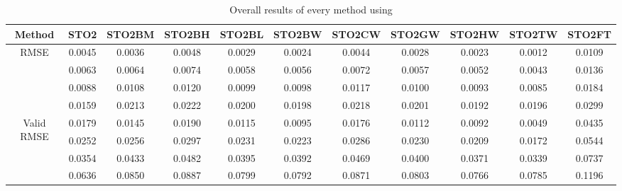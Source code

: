 \begin{table}[ht!]
\centering
\begin{tabular}{c|c|c|c|c|c|c|c|c|c|c}
Method & \scriptsize{STO2} & \scriptsize{STO2BM} & \scriptsize{STO2BH} & \scriptsize{STO2BL} & \scriptsize{STO2BW} & \scriptsize{STO2CW} & \scriptsize{STO2GW} & \scriptsize{STO2HW} & \scriptsize{STO2TW} & \scriptsize{STO2FT}\\ \hline 
\multirow{4}{*}{RMSE} & 0.0045 & 0.0036 & 0.0048 & 0.0029 & 0.0024 & 0.0044 & 0.0028 & 0.0023 & 0.0012 & 0.0109 \\ 
 & 0.0063 & 0.0064 & 0.0074 & 0.0058 & 0.0056 & 0.0072 & 0.0057 & 0.0052 & 0.0043 & 0.0136 \\ 
 & 0.0088 & 0.0108 & 0.0120 & 0.0099 & 0.0098 & 0.0117 & 0.0100 & 0.0093 & 0.0085 & 0.0184 \\ 
 & 0.0159 & 0.0213 & 0.0222 & 0.0200 & 0.0198 & 0.0218 & 0.0201 & 0.0192 & 0.0196 & 0.0299 \\ 
 \hline
\multirow{4}{*}{Valid RMSE} & 0.0179 & 0.0145 & 0.0190 & 0.0115 & 0.0095 & 0.0176 & 0.0112 & 0.0092 & 0.0049 & 0.0435 \\ 
 & 0.0252 & 0.0256 & 0.0297 & 0.0231 & 0.0223 & 0.0286 & 0.0230 & 0.0209 & 0.0172 & 0.0544 \\ 
 & 0.0354 & 0.0433 & 0.0482 & 0.0395 & 0.0392 & 0.0469 & 0.0400 & 0.0371 & 0.0339 & 0.0737 \\ 
 & 0.0636 & 0.0850 & 0.0887 & 0.0799 & 0.0792 & 0.0871 & 0.0803 & 0.0766 & 0.0785 & 0.1196 \\ 
 \hline 
\end{tabular}
\caption{Overall results of every method using }
\label{tab:STO2}
\end{table}


